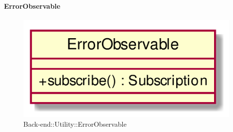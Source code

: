 \hypertarget{ErrorObservable_label}{\paragraph{ErrorObservable}}
\begin{figure}[h]
	\centering
	\includegraphics[width=\textwidth,height=\textheight,keepaspectratio]{images/ClassErrorObservable.png}
	\caption{Back-end::Utility::ErrorObservable}
\end{figure}
